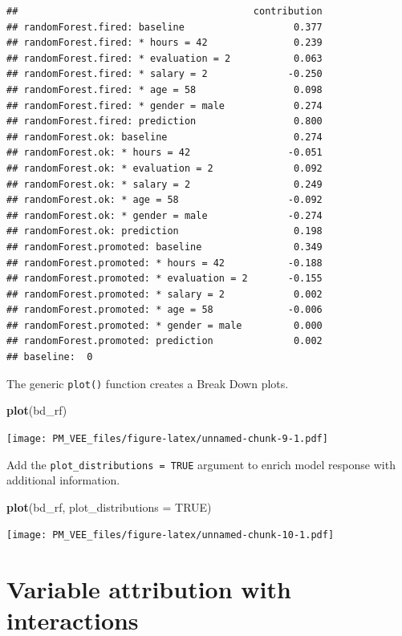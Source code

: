 \documentclass[]{krantz}
\newenvironment{Shaded}{\begin{snugshade}}{\end{snugshade}}
\newcommand{\DataTypeTok}[1]{\textcolor[rgb]{0.13,0.29,0.53}{#1}}
\newcommand{\KeywordTok}[1]{\textcolor[rgb]{0.13,0.29,0.53}{\textbf{#1}}}
\newcommand{\NormalTok}[1]{#1}
\newcommand{\OtherTok}[1]{\textcolor[rgb]{0.56,0.35,0.01}{#1}}
\theoremstyle{definition}
\theoremstyle{definition}
\theoremstyle{definition}
\theoremstyle{remark}
\begin{document}
\begin{verbatim}
##                                         contribution
## randomForest.fired: baseline                   0.377
## randomForest.fired: * hours = 42               0.239
## randomForest.fired: * evaluation = 2           0.063
## randomForest.fired: * salary = 2              -0.250
## randomForest.fired: * age = 58                 0.098
## randomForest.fired: * gender = male            0.274
## randomForest.fired: prediction                 0.800
## randomForest.ok: baseline                      0.274
## randomForest.ok: * hours = 42                 -0.051
## randomForest.ok: * evaluation = 2              0.092
## randomForest.ok: * salary = 2                  0.249
## randomForest.ok: * age = 58                   -0.092
## randomForest.ok: * gender = male              -0.274
## randomForest.ok: prediction                    0.198
## randomForest.promoted: baseline                0.349
## randomForest.promoted: * hours = 42           -0.188
## randomForest.promoted: * evaluation = 2       -0.155
## randomForest.promoted: * salary = 2            0.002
## randomForest.promoted: * age = 58             -0.006
## randomForest.promoted: * gender = male         0.000
## randomForest.promoted: prediction              0.002
## baseline:  0
\end{verbatim}

The generic \texttt{plot()} function creates a Break Down plots.

\begin{Shaded}
\begin{Highlighting}[]
\KeywordTok{plot}\NormalTok{(bd_rf) }
\end{Highlighting}
\end{Shaded}

\texttt{[image: PM\_VEE\_files/figure-latex/unnamed-chunk-9-1.pdf]}

Add the \texttt{plot\_distributions\ =\ TRUE} argument to enrich model
response with additional information.

\begin{Shaded}
\begin{Highlighting}[]
\KeywordTok{plot}\NormalTok{(bd_rf, }\DataTypeTok{plot_distributions =} \OtherTok{TRUE}\NormalTok{) }
\end{Highlighting}
\end{Shaded}

\texttt{[image: PM\_VEE\_files/figure-latex/unnamed-chunk-10-1.pdf]}

\hypertarget{variable-attribution-with-interactions}{%
\section{Variable attribution with
interactions}\label{variable-attribution-with-interactions}}
\end{document}
